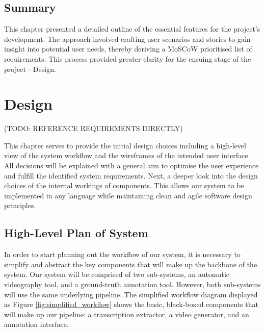 \documentclass{l4proj}
\begin{document}
\section{Summary}
This chapter presented a detailed outline of the essential features for the project's development. The approach involved crafting user scenarios and stories to gain insight into potential user needs, thereby deriving a MoSCoW prioritised list of requirements. This process provided greater clarity for the ensuing stage of the project - Design.




\chapter{Design}
(TODO: REFERENCE REQUIREMENTS DIRECTLY)

This chapter serves to provide the initial design choices including a high-level view of the system workflow and the wireframes of the intended user interface. All decisions will be explained with a general aim to optimise the user experience and fulfill the identified system requirements. Next, a deeper look into the design choices of the internal workings of components. This allows our system to be implemented in any language while maintaining clean and agile software design principles. 

\section{High-Level Plan of System}
In order to start planning out the workflow of our system, it is necessary to simplify and abstract the key components that will make up the backbone of the system. Our system will be comprised of two sub-systems, an automatic videography tool, and a ground-truth annotation tool. However, both sub-systems will use the same underlying pipeline. The simplified workflow diagram displayed as Figure \ref{fig:simplified_workflow} shows the basic, black-boxed components that will make up our pipeline: a transcription extractor, a video generator, and an annotation interface.
\end{document}
